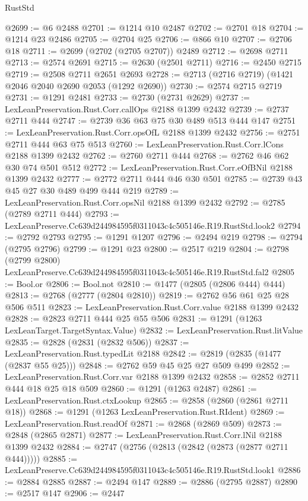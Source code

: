 \begin{lexlean}{RustStd}
\begin{coremodule}
@2699 := @6 @2488
@2701 := @1214 @10 @2487
@2702 := @2701 @18
@2704 := @1214 @23 @2486
@2705 := @2704 @25
@2706 := @866 @10
@2707 := @2706 @18
@2711 := @2699 (@2702 (@2705 @2707)) @2489
@2712 := @2698 @2711
@2713 := @2574 @2691
@2715 := @2630 (@2501 @2711)
@2716 := @2450 @2715
@2719 := @2508 @2711 @2651 @2693
@2728 := @2713 (@2716 @2719) (@1421 @2046 @2040 @2690 @2053 (@1292 @2690))
@2730 := @2574 @2715 @2719
@2731 := @1291 @2481
@2733 := @2730 (@2731 @2629)
@2737 := LexLeanPreservation.Rust.Corr.callOps @2188 @1399 @2432
@2739 := @2737 @2711 @444
@2747 := @2739 @36 @63 @75 @30 @489 @513 @444 @147
@2751 := LexLeanPreservation.Rust.Corr.opsOfL @2188 @1399 @2432
@2756 := @2751 @2711 @444 @63 @75 @513
@2760 := LexLeanPreservation.Rust.Corr.lCons @2188 @1399 @2432
@2762 := @2760 @2711 @444
@2768 := @2762 @46 @62 @30 @74 @501 @512
@2772 := LexLeanPreservation.Rust.Corr.eOfBNil @2188 @1399 @2432
@2777 := @2772 @2711 @444 @46 @30 @501
@2785 := @2739 @43 @45 @27 @30 @489 @499 @444 @219
@2789 := LexLeanPreservation.Rust.Corr.opsNil @2188 @1399 @2432
@2792 := @2785 (@2789 @2711 @444)
@2793 := LexLeanPreserve.Cc639d244984595f0311043c4c505146e.R19.RustStd.look2
@2794 := @2792 @2793
@2795 := @1291 @1207
@2796 := @2494 @219
@2798 := @2794 (@2795 @2796)
@2799 := @1291 @23
@2800 := @2517 @219
@2804 := @2798 (@2799 @2800) LexLeanPreserve.Cc639d244984595f0311043c4c505146e.R19.RustStd.fal2
@2805 := Bool.or
@2806 := Bool.not
@2810 := @1477 (@2805 (@2806 @444) @444)
@2813 := @2768 (@2777 (@2804 @2810))
@2819 := @2762 @56 @61 @25 @28 @506 @511
@2823 := LexLeanPreservation.Rust.Corr.value @2188 @1399 @2432
@2828 := @2823 @2711 @444 @25 @55 @506
@2831 := @1291 (@1263 LexLeanTarget.TargetSyntax.Value)
@2832 := LexLeanPreservation.Rust.litValue
@2835 := @2828 (@2831 (@2832 @506))
@2837 := LexLeanPreservation.Rust.typedLit @2188
@2842 := @2819 (@2835 (@1477 (@2837 @55 @25)))
@2848 := @2762 @59 @45 @25 @27 @509 @499
@2852 := LexLeanPreservation.Rust.Corr.var @2188 @1399 @2432
@2858 := @2852 @2711 @444 @18 @25 @18 @509
@2860 := @1291 (@1263 @2487)
@2861 := LexLeanPreservation.Rust.ctxLookup
@2865 := @2858 (@2860 (@2861 @2711 @18))
@2868 := @1291 (@1263 LexLeanPreservation.Rust.RIdent)
@2869 := LexLeanPreservation.Rust.readOf
@2871 := @2868 (@2869 @509)
@2873 := @2848 (@2865 @2871)
@2877 := LexLeanPreservation.Rust.Corr.lNil @2188 @1399 @2432
@2884 := @2747 (@2756 (@2813 (@2842 (@2873 (@2877 @2711 @444)))))
@2885 := LexLeanPreserve.Cc639d244984595f0311043c4c505146e.R19.RustStd.look1
@2886 := @2884 @2885
@2887 := @2494 @147
@2889 := @2886 (@2795 @2887)
@2890 := @2517 @147
@2906 := @2447

\end{coremodule}
\end{lexlean}
